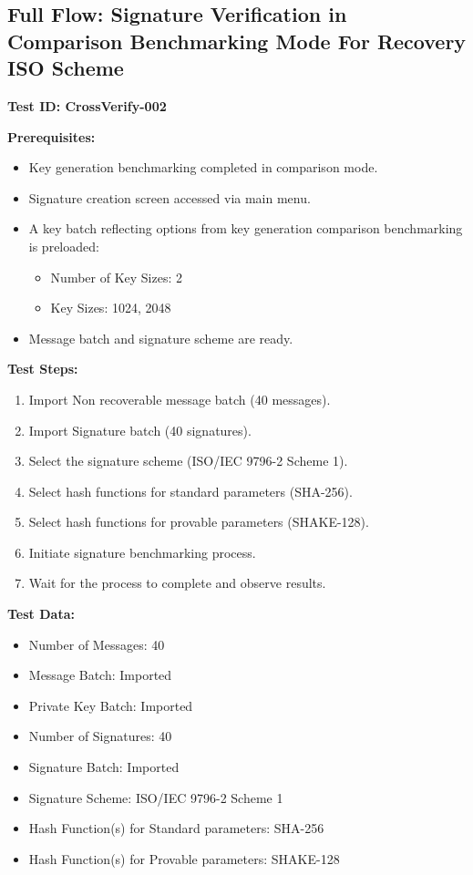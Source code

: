 \documentclass[]{final_report}
\theoremstyle{definition}
\begin{document}
\subsection*{Full Flow: Signature Verification in Comparison Benchmarking Mode For Recovery ISO Scheme}

\textbf{Test ID: CrossVerify-002}

\textbf{Prerequisites:}
\begin{itemize}
    \item Key generation benchmarking completed in comparison mode.
    \item Signature creation screen accessed via main menu.
    \item A key batch reflecting options from key generation comparison benchmarking is preloaded:
    \begin{itemize}
        \item Number of Key Sizes: 2
        \item Key Sizes: 1024, 2048
    \end{itemize}
    \item Message batch and signature scheme are ready.
\end{itemize}

\textbf{Test Steps:}
\begin{enumerate}
    \item Import Non recoverable message batch (40 messages).
     \item Import Signature batch (40 signatures).
    \item Select the signature scheme (ISO/IEC 9796-2 Scheme 1).
    \item Select hash functions for standard parameters (SHA-256).
    \item Select hash functions for provable parameters (SHAKE-128).
    \item Initiate signature benchmarking process.
    \item Wait for the process to complete and observe results.
\end{enumerate}

\textbf{Test Data:}
\begin{itemize}
    \item Number of Messages: 40
    \item Message Batch: Imported
    \item Private Key Batch: Imported
     \item Number of Signatures: 40
     \item Signature Batch: Imported
    \item Signature Scheme: ISO/IEC 9796-2 Scheme 1
    \item Hash Function(s) for Standard parameters: SHA-256
    \item Hash Function(s) for Provable parameters: SHAKE-128
\end{itemize}
\end{document}

